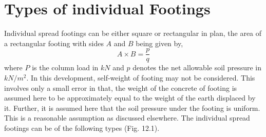 \documentclass{report}
\begin{document}
\section{Types of individual Footings} Individual spread footings can be
either square or rectangular in plan, the area of a rectangular footing with
sides $A$ and $B$ being given by,
\begin{equation}
\label{eq:footingArea}
A \times B = \frac{p}{q}
\end{equation}
where $P$ is the column load in $kN$ and $p$ denotes the net allowable soil
pressure in $kN/m^2$. In this development, self-weight of footing may not
be considered. This involves only a small error in that, the weight of the
concrete of footing is assumed here to be approximately equal to the weight
of the earth displaced by it. Further, it is assumed here that the soil
pressure under the footing is uniform. This is a reasonable assumption as
discussed elsewhere. The individual spread footings can be of the following
types (Fig.  12.1).
\end{document}
